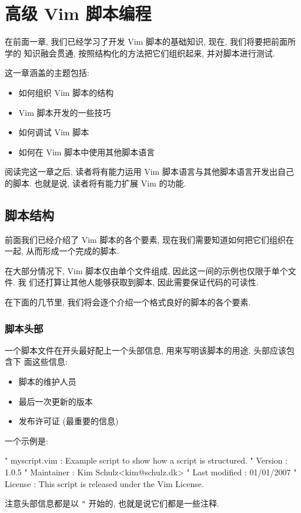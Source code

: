 \chapter{高级 Vim 脚本编程}
\label{chap:extended_vim_scripting}

在前面一章, 我们已经学习了开发 Vim 脚本的基础知识, 现在, 我们将要把前面所学的
知识融会贯通, 按照结构化的方法把它们组织起来, 并对脚本进行测试.

这一章涵盖的主题包括:
\begin{itemize}
    \item 如何组织 Vim 脚本的结构
    \item Vim 脚本开发的一些技巧
    \item 如何调试 Vim 脚本
    \item 如何在 Vim 脚本中使用其他脚本语言
\end{itemize}

阅读完这一章之后, 读者将有能力运用 Vim 脚本语言与其他脚本语言开发出自己的脚本.
也就是说, 读者将有能力扩展 Vim 的功能.

\section{脚本结构}
\label{sec:script_structure}

前面我们已经介绍了 Vim 脚本的各个要素, 现在我们需要知道如何把它们组织在一起,
从而形成一个完成的脚本.

在大部分情况下, Vim 脚本仅由单个文件组成, 因此这一间的示例也仅限于单个文件. 我
们还打算让其他人能够获取到脚本, 因此需要保证代码的可读性.

在下面的几节里, 我们将会逐个介绍一个格式良好的脚本的各个要素.

\subsection{脚本头部}
\label{subsec:script_header}

一个脚本文件在开头最好配上一个头部信息, 用来写明该脚本的用途. 头部应该包含下
面这些信息:
\begin{itemize}
    \item 脚本的维护人员
    \item 最后一次更新的版本
    \item 发布许可证 (最重要的信息)
\end{itemize}
一个示例是:
\begin{vimcode}
    " myscript.vim  : Example script to show how a script is structured.
    " Version       : 1.0.5
    " Maintainer    : Kim Schulz<kim@schulz.dk>
    " Last modified : 01/01/2007
    " License       : This script is released under the Vim License.
\end{vimcode}
注意头部信息都是以 \texttt{"} 开始的, 也就是说它们都是一些注释.

